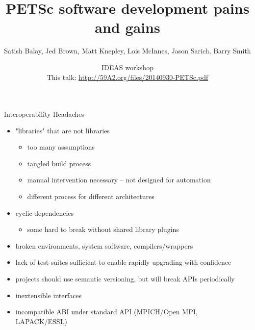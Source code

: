 \documentclass{beamer}
\title{PETSc software development pains and gains}
\author{Satish Balay, Jed Brown, Matt Knepley, Lois McInnes, Jason Sarich, Barry Smith}
\date{IDEAS workshop \\[1em]
{\small This talk: \url{http://59A2.org/files/20140930-PETSc.pdf}}}
\begin{document}
\lstset{language=C}
\normalem

\begin{frame}
  \titlepage
\end{frame}

\begin{frame}{Interoperability Headaches}
  \begin{itemize}
  \item "libraries" that are not libraries
    \begin{itemize}
    \item too many assumptions
    \item tangled build process
    \item manual intervention necessary -- not designed for automation
    \item different process for different architectures
    \end{itemize}
  \item cyclic dependencies
    \begin{itemize}
    \item some hard to break without shared library plugins
    \end{itemize}
  \item broken environments, system software, compilers/wrappers
  \item lack of test suites sufficient to enable rapidly upgrading with confidence
  \item projects should use semantic versioning, but will break APIs periodically
  \item inextensible interfaces
  \item incompatible ABI under standard API (MPICH/Open MPI, LAPACK/ESSL)
  \end{itemize}
\end{frame}
\end{document}

